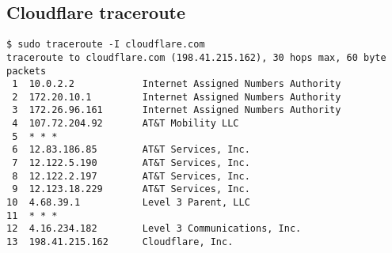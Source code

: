 \documentclass[11pt]{article}
\begin{document}
\subsection{Cloudflare traceroute}
\label{app:traceroute}

\begin{Verbatim}[obeytabs, tabsize=4]
$ sudo traceroute -I cloudflare.com
traceroute to cloudflare.com (198.41.215.162), 30 hops max, 60 byte packets
 1  10.0.2.2            Internet Assigned Numbers Authority
 2  172.20.10.1         Internet Assigned Numbers Authority
 3  172.26.96.161       Internet Assigned Numbers Authority
 4  107.72.204.92       AT&T Mobility LLC
 5  * * *
 6  12.83.186.85        AT&T Services, Inc.
 7  12.122.5.190        AT&T Services, Inc.
 8  12.122.2.197        AT&T Services, Inc.
 9  12.123.18.229       AT&T Services, Inc.
10  4.68.39.1           Level 3 Parent, LLC
11  * * *
12  4.16.234.182        Level 3 Communications, Inc.
13  198.41.215.162      Cloudflare, Inc.
\end{Verbatim}
\end{document}
